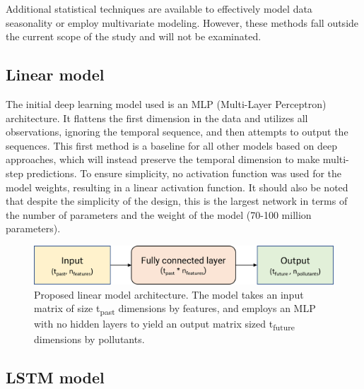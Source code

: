 Additional statistical techniques are available to effectively model data seasonality or employ multivariate modeling. However, these methods fall outside the current scope of the study and will not be examinated.

\subsection{Linear model}

The initial deep learning model used is an MLP (Multi-Layer Perceptron) architecture. It flattens the first dimension in the data and utilizes all observations, ignoring the temporal sequence, and then attempts to output the sequences. This first method is a baseline for all other models based on deep approaches, which will instead preserve the temporal dimension to make multi-step predictions.
To ensure simplicity, no activation function was used for the model weights, resulting in a linear activation function. It should also be noted that despite the simplicity of the design, this is the largest network in terms of the number of parameters and the weight of the model (70-100 million parameters).

\begin{figure}
    \centering
    \includegraphics[width=0.7\linewidth]{images/model architectures/linearmodel.png}
    \caption{Proposed linear model architecture. The model takes an input matrix of size t\textsubscript{past} dimensions by features, and employs an MLP with no hidden layers to yield an output matrix sized t\textsubscript{future} dimensions by pollutants.}
    \label{fig:linearmodel}
\end{figure}

\subsection{LSTM model}

